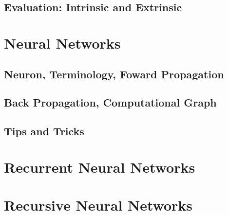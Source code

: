 \documentclass{article}
\begin{document}
\subsection{Evaluation: Intrinsic and Extrinsic}

\section{Neural Networks}

\subsection{Neuron, Terminology, Foward Propagation}

\subsection{Back Propagation, Computational Graph}

\subsection{Tips and Tricks}

\section{Recurrent Neural Networks}

\section{Recursive Neural Networks}

\section{}
\end{document}
